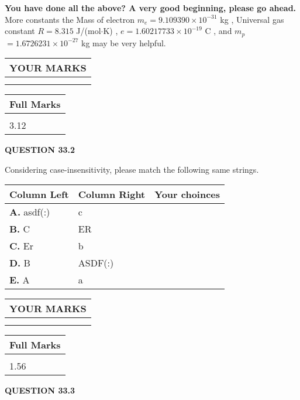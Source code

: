 \documentclass[12pt]{article}
\begin{document}
 
 

 

 
\vspace{0.3in}
   
   
\vspace{0.3in}
{\textbf{\LARGE{You have done all the above? A very good beginning, please go ahead.}}}
More constants the
Mass of electron
$m_e$$ =
9.109390 \times 10^{-31} $
kg
,
Universal gas constant
$R$$ =
8.315 $
J/(mol$\cdot $K)
,
$e$$ =
1.60217733 \times 10^{-19} $
C
, and
$m_p$$ =
1.6726231 \times 10^{-27} $
kg
%
may be very helpful.
\vspace{0.3in}
   
   
  
\vspace{0.2in}
  
\noindent\begin{tabular}{|l|}
\hline
 YOUR MARKS  \\
\hline
 \\ 
 \\ 
\hline
\end{tabular}
\hspace{0.05in} \begin{tabular}{|l|}
\hline
 Full Marks  \\
\hline
 \\ 
3.12 \\
\hline
\end{tabular}
{\textbf{\Large{QUESTION
33.2 
}}}
  
  
Considering case-insensitivity, please match the following same strings.
  
  
\begin{tabular}{|l|l|l|}
 \hline
 Column Left & Column Right  & Your choinces \\ 
 \hline
{\textbf{\large{
A.}}}
asdf(:)
  & 
c
 & 
 \\ 
 \hline
{\textbf{\large{
B.}}}
C
  & 
ER
 & 
 \\ 
 \hline
{\textbf{\large{
C.}}}
Er
  & 
b
 & 
 \\ 
 \hline
{\textbf{\large{
D.}}}
B
  & 
ASDF(:)
 & 
 \\ 
 \hline
{\textbf{\large{
E.}}}
A
  & 
a
 & 
 \\ 
 \hline
 \end{tabular}
  
  
 
  
\vspace{0.2in}
  
\noindent\begin{tabular}{|l|}
\hline
 YOUR MARKS  \\
\hline
 \\ 
 \\ 
\hline
\end{tabular}
\hspace{0.05in} \begin{tabular}{|l|}
\hline
 Full Marks  \\
\hline
 \\ 
1.56 \\
\hline
\end{tabular}
{\textbf{\Large{QUESTION
33.3 
}}}
  
\end{document}

